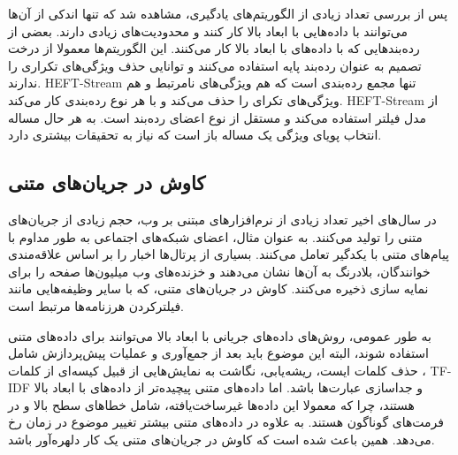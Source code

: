 پس از بررسی تعداد زیادی از الگوریتم‌های یادگیری، مشاهده شد که تنها اندکی از آن‌ها می‌توانند با داده‌هایی با ابعاد بالا کار کنند و محدودیت‌های زیادی دارند. بعضی از رده‌بندهایی که با داده‌های با ابعاد بالا کار می‌کنند. این الگوریتم‌ها معمولا از درخت تصمیم به عنوان رده‌بند پایه استفاده می‌کنند و توانایی حذف ویژگی‌های تکراری را ندارند. HEFT-Stream تنها مجمع رده‌بندی است که هم ویژگی‌های نامرتبط و هم ویژگی‌های تکرای را حذف می‌کند و با هر نوع رده‌بندی کار می‌کند. HEFT-Stream از مدل فیلتر استفاده می‌کند و مستقل از نوع اعضای رده‌بند است. به هر حال مساله انتخاب پویای ویژگی یک مساله باز است که نیاز به تحقیقات بیشتری دارد\cite{Nguyen2015}.


\subsection{کاوش در جریان‌های متنی}
در سال‌های اخیر تعداد زیادی از نرم‌افزار‌های مبتنی بر وب، حجم زیادی از جریان‌های متنی را تولید می‌کنند. به عنوان مثال، اعضای شبکه‌های اجتماعی به طور مداوم با پیام‌های متنی با یکدگیر تعامل می‌کنند. بسیاری از پرتال‌ها اخبار را بر اساس علاقه‌مندی خوانندگان، بلادرنگ به آن‌ها نشان می‌دهند و خزنده‌های وب میلیون‌ها صفحه را برای نمایه سازی ذخیره می‌کنند. کاوش در جریان‌های متنی، که با سایر وظیفه‌هایی مانند فیلترکردن هرزنامه‌ها مرتبط است.

به طور عمومی، روش‌های داده‌های جریانی با ابعاد بالا می‌توانند برای داده‌های متنی استفاده شوند، البته این موضوع باید بعد از جمع‌آوری و عملیات پیش‌پردازش شامل حذف کلمات ایست، ریشه‌یابی، نگاشت به نمایش‌هایی از قبیل کیسه‌ای از کلمات
، TF-IDF
و جداسازی عبارت‌ها باشد. اما داده‌های متنی پیچیده‌تر از داده‌های با ابعاد بالا هستند، چرا که معمولا این داده‌ها غیرساخت‌یافته، شامل خطاهای سطح بالا و در فرمت‌های گوناگون هستند. به علاوه در داده‌های متنی بیشتر تغییر موضوع در زمان رخ می‌دهد. همین باعث شده است که کاوش در جریان‌های متنی یک کار دلهره‌آور باشد\cite{Nguyen2015}.
